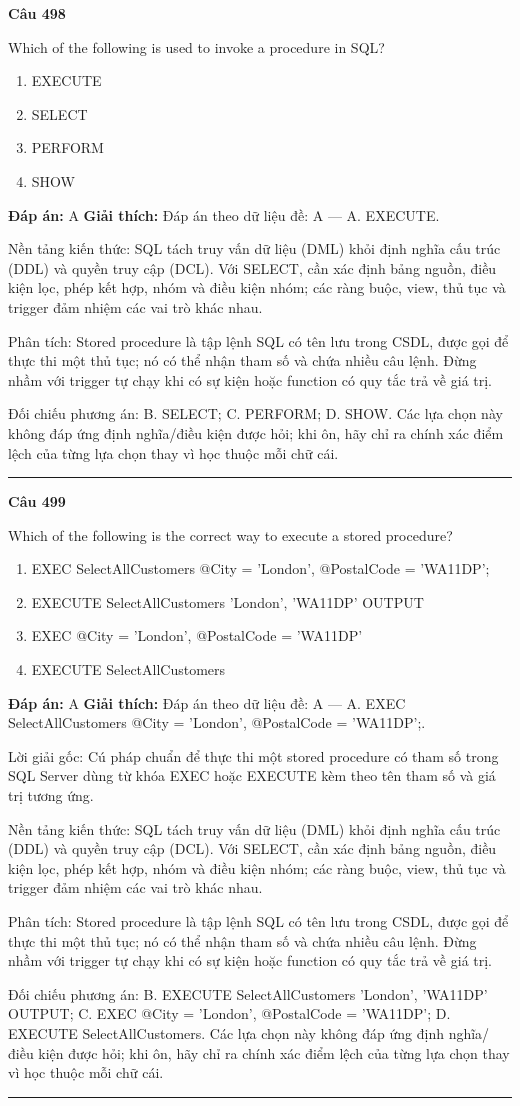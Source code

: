 \documentclass[11pt,a4paper]{article}
\newenvironment{question}[1]{%
  \par\vspace{1em}\noindent\textbf{\large Câu #1}\par\vspace{0.4em}
}{%
  \par\vspace{1em}\hrule\vspace{0.6em}
}
\newenvironment{choices}{%
  \begin{enumerate}[label=\textbf{\Alph*.},leftmargin=2.2em,itemsep=2pt,topsep=3pt]
}{%
  \end{enumerate}
}
\newcommand{\choice}{\item}
\begin{document}
\begin{question}{498}
Which of the following is used to invoke a procedure in SQL?
\begin{choices}
\choice EXECUTE
\choice SELECT
\choice PERFORM
\choice SHOW
\end{choices}
\textbf{Đáp án:} A
\textbf{Giải thích:} Đáp án theo dữ liệu đề: A — A. EXECUTE.

Nền tảng kiến thức: SQL tách truy vấn dữ liệu (DML) khỏi định nghĩa cấu trúc (DDL) và quyền truy cập (DCL). Với SELECT, cần xác định bảng nguồn, điều kiện lọc, phép kết hợp, nhóm và điều kiện nhóm; các ràng buộc, view, thủ tục và trigger đảm nhiệm các vai trò khác nhau.

Phân tích: Stored procedure là tập lệnh SQL có tên lưu trong CSDL, được gọi để thực thi một thủ tục; nó có thể nhận tham số và chứa nhiều câu lệnh. Đừng nhầm với trigger tự chạy khi có sự kiện hoặc function có quy tắc trả về giá trị.

Đối chiếu phương án: B. SELECT; C. PERFORM; D. SHOW. Các lựa chọn này không đáp ứng định nghĩa/điều kiện được hỏi; khi ôn, hãy chỉ ra chính xác điểm lệch của từng lựa chọn thay vì học thuộc mỗi chữ cái.
\end{question}

\begin{question}{499}
Which of the following is the correct way to execute a stored procedure?
\begin{choices}
\choice EXEC SelectAllCustomers @City = 'London', @PostalCode = 'WA11DP';
\choice EXECUTE SelectAllCustomers 'London', 'WA11DP' OUTPUT
\choice EXEC @City = 'London', @PostalCode = 'WA11DP'
\choice EXECUTE SelectAllCustomers
\end{choices}
\textbf{Đáp án:} A
\textbf{Giải thích:} Đáp án theo dữ liệu đề: A — A. EXEC SelectAllCustomers @City = 'London', @PostalCode = 'WA11DP';.

Lời giải gốc: Cú pháp chuẩn để thực thi một stored procedure có tham số trong SQL Server dùng từ khóa EXEC hoặc EXECUTE kèm theo tên tham số và giá trị tương ứng.

Nền tảng kiến thức: SQL tách truy vấn dữ liệu (DML) khỏi định nghĩa cấu trúc (DDL) và quyền truy cập (DCL). Với SELECT, cần xác định bảng nguồn, điều kiện lọc, phép kết hợp, nhóm và điều kiện nhóm; các ràng buộc, view, thủ tục và trigger đảm nhiệm các vai trò khác nhau.

Phân tích: Stored procedure là tập lệnh SQL có tên lưu trong CSDL, được gọi để thực thi một thủ tục; nó có thể nhận tham số và chứa nhiều câu lệnh. Đừng nhầm với trigger tự chạy khi có sự kiện hoặc function có quy tắc trả về giá trị.

Đối chiếu phương án: B. EXECUTE SelectAllCustomers 'London', 'WA11DP' OUTPUT; C. EXEC @City = 'London', @PostalCode = 'WA11DP'; D. EXECUTE SelectAllCustomers. Các lựa chọn này không đáp ứng định nghĩa/điều kiện được hỏi; khi ôn, hãy chỉ ra chính xác điểm lệch của từng lựa chọn thay vì học thuộc mỗi chữ cái.
\end{question}
\end{document}
